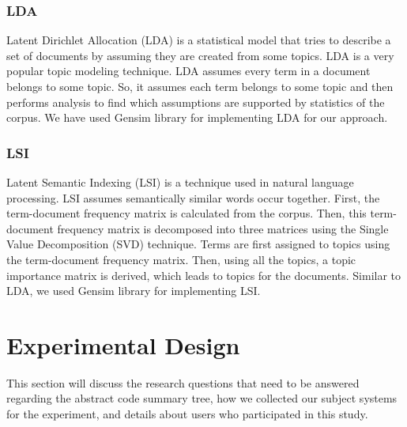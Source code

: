 \subsubsection{LDA}
Latent Dirichlet Allocation (LDA) \cite{blei2003latentLDA} is a statistical model that tries to describe a set of documents by assuming they are created from some topics. LDA is a very popular topic modeling technique. LDA assumes every term in a document belongs to some topic. So, it assumes each term belongs to some topic and then performs analysis to find which assumptions are supported by statistics of the corpus. We have used Gensim \cite{gensim} library for implementing LDA for our approach.
\subsubsection{LSI}
Latent Semantic Indexing (LSI) \cite{deerwester1990indexingLSI} is a technique used in natural language processing. LSI assumes semantically similar words occur together. First, the term-document frequency matrix is calculated from the corpus. Then, this term-document frequency matrix is decomposed into three matrices using the Single Value Decomposition (SVD) technique. Terms are first assigned to topics using the term-document frequency matrix. Then, using all the topics, a topic importance matrix is derived, which leads to topics for the documents. Similar to LDA, we used Gensim \cite{gensim} library for implementing LSI. 

\section{Experimental Design}
\label{Experimental}
This section will discuss the research questions that need to be answered regarding the abstract code summary tree, how we collected our subject systems for the experiment, and details about users who participated in this study.
